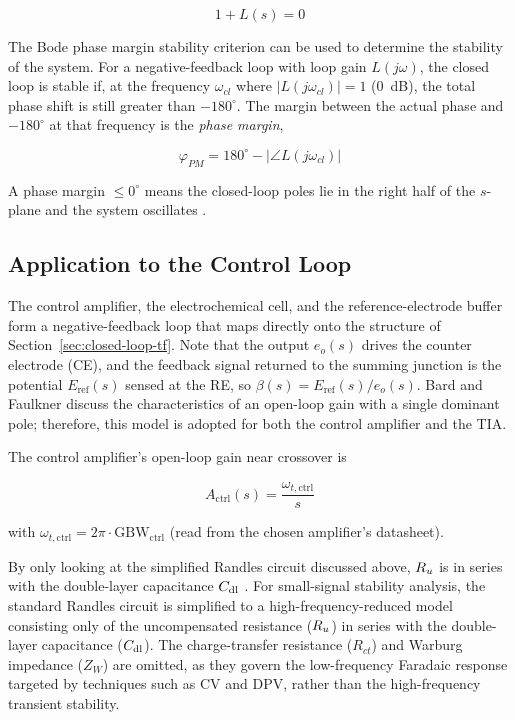 \begin{equation}
1+L(s) = 0
\label{eq:char_eq}
\end{equation}
 
The Bode phase margin stability criterion can be used to determine the stability of the system. For a negative-feedback loop with loop gain $L(j\omega)$, the closed loop is stable if, at the frequency $\omega_{cl}$ where $|L(j\omega_{cl})| = 1$ (0~dB), the total phase shift is still greater than $-180^\circ$. The margin between the actual phase and $-180^\circ$ at that frequency is the \emph{phase margin},
 
\begin{equation}
\varphi_{PM} = 180^\circ - |\angle L(j\omega_{cl})|
\label{eq:phase_margin_def}
\end{equation}
 
A phase margin $\leq 0^\circ$ means the closed-loop poles lie in the right half of the $s$-plane and the system oscillates \cite{c2}.
 
\subsection{Application to the Control Loop}
\label{sec:control-loop}
 
The control amplifier, the electrochemical cell, and the reference-electrode buffer form a negative-feedback loop that maps directly onto the structure of Section~\ref{sec:closed-loop-tf}. Note that the output $e_o(s)$ drives the counter electrode (CE), and the feedback signal returned to the summing junction is the potential $E_{\text{ref}}(s)$ sensed at the RE, so $\beta(s) = E_{\text{ref}}(s)/e_o(s)$. Bard and Faulkner \cite{bard2001} discuss the characteristics of an open-loop gain with a single dominant pole; therefore, this model is adopted for both the control amplifier and the TIA.
 
The control amplifier's open-loop gain near crossover is
 
\begin{equation}
A_{\text{ctrl}}(s) = \frac{\omega_{t,\text{ctrl}}}{s}
\label{eq:actrl}
\end{equation}
 
with $\omega_{t,\text{ctrl}} = 2\pi \cdot \mathrm{GBW}_{\text{ctrl}}$ (read from the chosen amplifier's datasheet).
 
By only looking at the simplified Randles circuit discussed above, $R_{u}$ is in series with the double-layer capacitance $C_{\mathrm{dl}}$ \cite{c5,bard2001,c7,c8}. For small-signal stability analysis, the standard Randles circuit is simplified to a high-frequency-reduced model consisting only of the uncompensated resistance ($R_{u}$) in series with the double-layer capacitance ($C_{\mathrm{dl}}$). The charge-transfer resistance ($R_{ct}$) and Warburg impedance ($Z_W$) are omitted, as they govern the low-frequency Faradaic response targeted by techniques such as CV and DPV, rather than the high-frequency transient stability.


